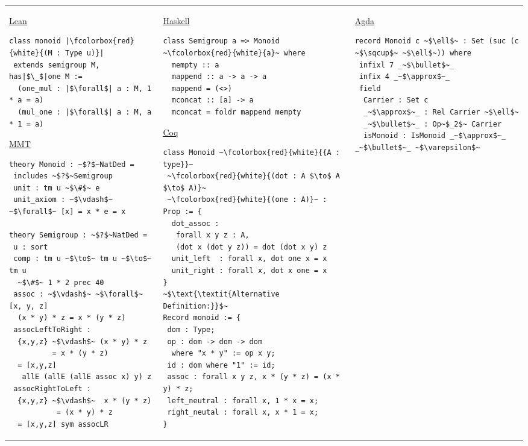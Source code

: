 \footnotesize
\begin{adjustbox}{width=1.2\columnwidth,center}
\begin{tabular}{p{7cm} p{7cm} p{7cm}}  
\underline{Lean}
\begin{verbatim} 
class monoid |\fcolorbox{red}{white}{(M : Type u)}|
 extends semigroup M, has|$\_$|one M :=
  (one_mul : |$\forall$| a : M, 1 * a = a) 
  (mul_one : |$\forall$| a : M, a * 1 = a)   
\end{verbatim} 
\vspace{0.5cm}
\underline{MMT}
\begin{verbatim}
theory Monoid : ~$?$~NatDed = 
 includes ~$?$~Semigroup 
 unit : tm u ~$\#$~ e 
 unit_axiom : ~$\vdash$~ ~$\forall$~ [x] = x * e = x    
 
theory Semigroup : ~$?$~NatDed = 
 u : sort 
 comp : tm u ~$\to$~ tm u ~$\to$~ tm u 
  ~$\#$~ 1 * 2 prec 40
 assoc : ~$\vdash$~ ~$\forall$~ [x, y, z]
  (x * y) * z = x * (y * z)    
 assocLeftToRight : 
  {x,y,z} ~$\vdash$~ (x * y) * z 
          = x * (y * z) 
  = [x,y,z] 
   allE (allE (allE assoc x) y) z
 assocRightToLeft : 
  {x,y,z} ~$\vdash$~  x * (y * z) 
           = (x * y) * z 
  = [x,y,z] sym assocLR    
\end{verbatim}     
&
\underline{Haskell}
\begin{verbatim}
class Semigroup a => Monoid ~\fcolorbox{red}{white}{a}~ where 
  mempty :: a 
  mappend :: a -> a -> a 
  mappend = (<>) 
  mconcat :: [a] -> a 
  mconcat = foldr mappend mempty 
\end{verbatim} 
\vspace{0.5cm}
\underline{Coq}
\begin{verbatim}
class Monoid ~\fcolorbox{red}{white}{{A : type}}~
 ~\fcolorbox{red}{white}{(dot : A $\to$ A $\to$ A)}~
 ~\fcolorbox{red}{white}{(one : A)}~ : Prop := {
  dot_assoc : 
   forall x y z : A, 
   (dot x (dot y z)) = dot (dot x y) z
  unit_left  : forall x, dot one x = x 
  unit_right : forall x, dot x one = x              
}
~$\text{\textit{Alternative Definition:}}$~
Record monoid := {
 dom : Type; 
 op : dom -> dom -> dom 
  where "x * y" := op x y; 
 id : dom where "1" := id; 
 assoc : forall x y z, x * (y * z) = (x * y) * z; 
 left_neutral : forall x, 1 * x = x; 
 right_neutal : forall x, x * 1 = x; 
}
\end{verbatim} 
&
\underline{Agda}
\begin{verbatim} 
record Monoid c ~$\ell$~ : Set (suc (c ~$\sqcup$~ ~$\ell$~)) where 
 infixl 7 _~$\bullet$~_
 infix 4 _~$\approx$~_
 field 
  Carrier : Set c 
  _~$\approx$~_ : Rel Carrier ~$\ell$~ 
  _~$\bullet$~_ : Op~$_2$~ Carrier 
  isMonoid : IsMonoid _~$\approx$~_ _~$\bullet$~_ ~$\varepsilon$~ 
  

\end{verbatim}
\end{tabular}
\end{adjustbox}
